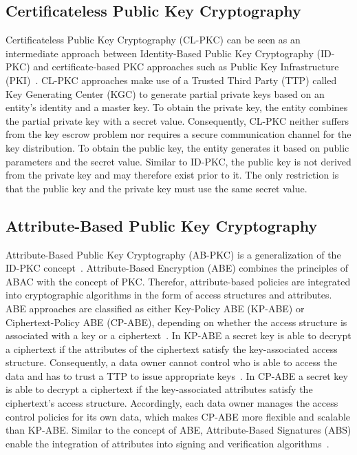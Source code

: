 \subsection{Certificateless Public Key Cryptography}
Certificateless Public Key Cryptography (CL-PKC) can be seen as an intermediate approach between Identity-Based Public Key Cryptography (ID-PKC) and certificate-based PKC approaches such as Public Key Infrastructure (PKI)~\cite{AlRiyami2003}.
CL-PKC approaches make use of a Trusted Third Party (TTP) called Key Generating Center (KGC) to generate partial private keys based on an entity's identity and a master key.
To obtain the private key, the entity combines the partial private key with a secret value.
Consequently, CL-PKC neither suffers from the key escrow problem nor requires a secure communication channel for the key distribution.
To obtain the public key, the entity generates it based on public parameters and the secret value.
Similar to ID-PKC, the public key is not derived from the private key and may therefore exist prior to it.
The only restriction is that the public key and the private key must use the same secret value.

\subsection{Attribute-Based Public Key Cryptography}
Attribute-Based Public Key Cryptography (AB-PKC) is a generalization of the ID-PKC concept~\cite{Sahai2005,Goyal2006,Hu2023}.
Attribute-Based Encryption (ABE) combines the principles of ABAC with the concept of PKC.
Therefor, attribute-based policies are integrated into cryptographic algorithms in the form of access structures and attributes.
ABE approaches are classified as either Key-Policy ABE (KP-ABE) or Ciphertext-Policy ABE (CP-ABE), depending on whether the access structure is associated with a key or a ciphertext~\cite{Goyal2006,Bethencourt2007,Hu2023}.
In KP-ABE a secret key is able to decrypt a ciphertext if the attributes of the ciphertext satisfy the key-associated access structure.
Consequently, a data owner cannot control who is able to access the data and has to trust a TTP to issue appropriate keys~\cite{Bethencourt2007}.
In CP-ABE a secret key is able to decrypt a ciphertext if the key-associated attributes satisfy the ciphertext's access structure.
Accordingly, each data owner manages the access control policies for its own data, which makes CP-ABE more flexible and scalable than KP-ABE.
Similar to the concept of ABE, Attribute-Based Signatures (ABS) enable the integration of attributes into signing and verification algorithms~\cite{Li2010,Maji2011}.
